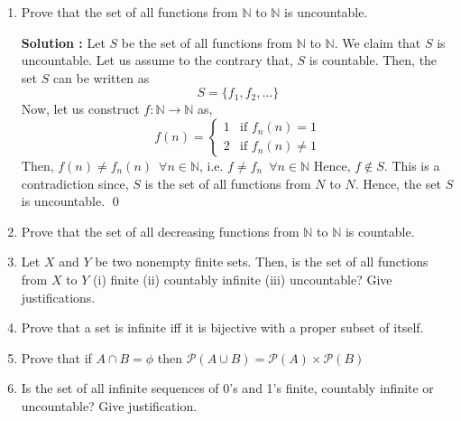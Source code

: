 \documentclass[10pt]{article}
\newcommand{\nn}{\mathbb{N}}
\newcommand{\p}{\mathcal{P}}
\begin{document}
\begin{enumerate}
    \textbf{Solution : } Since there is an infinite sequence in which each element of $A$ appears at least once, $\exists f : \nn \to A$ such that $f$ is surjective. Since $\nn$ is countable, $A$ must also be countable. \qed    
    \item Prove that the set of all functions from $\nn$ to $\nn$ is uncountable.

    \textbf{Solution : }Let $S$ be the set of all functions from $\nn$ to $\nn$. We claim that $S$ is uncountable. Let us assume to the contrary that, $S$ is countable. Then, the set $S$ can be written as $$S = \{f_1, f_2, \dots \}$$ Now, let us construct $f : \nn \to \nn$ as, 
    \begin{equation*}
        f(n) = 
        \begin{cases}
            1 & \text{if } f_n(n) = 1 \\
            2 & \text{if } f_n(n) \neq 1
        \end{cases}
    \end{equation*}
    Then, $f(n) \neq f_n(n) \,\,\, \forall n \in \nn$, i.e. $f \neq f_n \,\,\, \forall n \in \nn$ Hence, $f \notin S$. This is a contradiction since, $S$ is the set of all functions from $N$ to $N$. Hence, the set $S$ is uncountable. \qed
    \item Prove that the set of all decreasing functions from $\nn$ to $\nn$ is countable.
    \item Let $X$ and $Y$ be two nonempty finite sets. Then, is the set of all functions from $X$ to $Y$ (i) finite (ii) countably infinite (iii) uncountable? Give justifications.
    \item Prove that a set is infinite iff it is bijective with a proper subset of itself.
    \item Prove that if $A \cap B = \phi$ then $\p(A \cup B) = \p(A) \times \p(B)$
    \item Is the set of all infinite sequences of 0's and 1's finite, countably infinite or uncountable? Give justification.


\end{enumerate}
\end{document}
